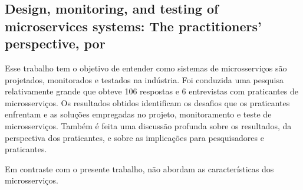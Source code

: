 \subsection{Design, monitoring, and testing of microservices systems: The practitioners’ perspective, por }

Esse trabalho tem o objetivo de entender como sistemas de microsserviços são projetados, monitorados e testados na indústria. Foi conduzida uma pesquisa relativamente grande que obteve 106 respostas e 6 entrevistas com praticantes de microsserviços. Os resultados obtidos identificam os desafios que os praticantes enfrentam e as soluções empregadas no projeto, monitoramento e teste de microsserviços. Também é feita uma discussão profunda sobre os resultados, da perspectiva dos praticantes, e sobre as implicações para pesquisadores e praticantes.

Em contraste com o presente trabalho,  não abordam as características dos microsserviços.



